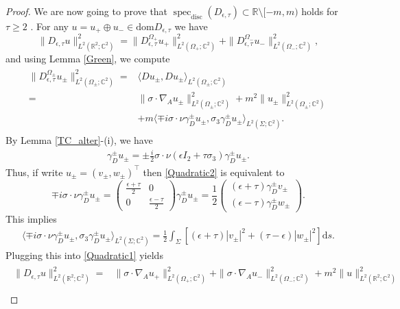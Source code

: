 \documentclass[11pt,a4paper,reqno,oneside]{amsproc}
\DeclareMathOperator{\dom}{dom}
\DeclareMathOperator{\spec}{spec}
\newcommand{\specd}{\spec_\mathrm{disc}}
\def \rr {{\mathbb R}}
\def \cc {{\mathbb C}}
\numberwithin{equation}{section}
\def\dom{\mathrm{dom}}
\def \cc {{\mathbb{C}}}
\begin{document}
\begin{proof}
We are now going to prove that $\specd(D_{\epsilon,\tau})\subset \rr\setminus [-m,m)$ holds for $\tau\geq2$ .  For any $u=u_+\oplus u_-\in\dom D_{\epsilon,\tau}$ we have 
\[
\|D_{\epsilon,\tau}u \|^2_{L^2(\rr^2;\cc^2)}= \|D_{\epsilon,\tau}^{\Omega_+}u_+ \|^2_{L^2(\Omega_+;\cc^2)}+\|D_{\epsilon,\tau}^{\Omega_-} u_- \|^2_{L^2(\Omega_-;\cc^2)},
\]
 and using Lemma \ref{Green}, we compute    
 \begin{align}\label{Quadratic1}
 \begin{split}
 \|D_{\epsilon,\tau}^{\Omega_\pm}u_\pm \|^2_{L^2(\Omega_\pm;\cc^2)}=& \langle D u_\pm, D u_\pm\rangle_{L^2(\Omega_\pm;\cc^2)}\\
 =&  \|\sigma\cdot\nabla_Au_\pm \|^2_{L^2(\Omega_\pm;\cc^2)} + m^2  \| u_\pm \|^2_{L^2(\Omega_\pm;\cc^2)}\\
 &+m\langle \mp i\sigma\cdot\nu \gamma_D^\pm u_\pm, \sigma_3 \gamma_D^\pm u_\pm\rangle_{L^2(\Sigma;\cc^2)} .  
 \end{split}
 \end{align}
By Lemma \ref{TC_alter}-(i), we have 
 \begin{align}\label{Quadratic2}
 \gamma_D^\pm u_\pm= \pm\frac{i}{2}\sigma\cdot\nu(\epsilon I_2+\tau\sigma_3)\gamma_D^\pm u_\pm.
 \end{align}
 Thus, if write  $u_\pm =(v_\pm,w_\pm)^\top$ then  \eqref{Quadratic2} is equivalent to
 \[
 \mp i\sigma\cdot\nu \gamma_D^\pm u_\pm= \begin{pmatrix}
     \frac{\epsilon+\tau}{2} & 0\\
     0 & \frac{\epsilon-\tau}{2}
 \end{pmatrix} \gamma_D^\pm u_\pm  = \frac{1}{2} \begin{pmatrix}(\epsilon+\tau)\gamma_D^\pm v_\pm\\
(\epsilon-\tau) \gamma_D^\pm w_\pm
 \end{pmatrix}.
 \]
 This implies 
 \begin{align*}
 \langle \mp i\sigma\cdot\nu \gamma_D^\pm u_\pm, \sigma_3 \gamma_D^\pm u_\pm\rangle_{L^2(\Sigma;\cc^2)}= \frac{1}{2}\int_\Sigma \left[  (\epsilon+\tau) |v_\pm |^2 + (\tau-\epsilon) |w_\pm |^2 \right]\mathrm{d}s.
 \end{align*}
  Plugging this into  \eqref{Quadratic1}  yields 
 \begin{align}\label{Quadratic3}
 \begin{split}
 \|D_{\epsilon,\tau}u \|^2_{L^2(\rr^2;\cc^2)} =&  \|\sigma\cdot\nabla_A u_+ \|^2_{L^2(\Omega_+;\cc^2)} + \|\sigma\cdot\nabla_A u_- \|^2_{L^2(\Omega_-;\cc^2)} + m^2 \|u \|^2_{L^2(\rr^2;\cc^2)} \\

\end{split}
\end{align}
\end{proof}
\end{document}
